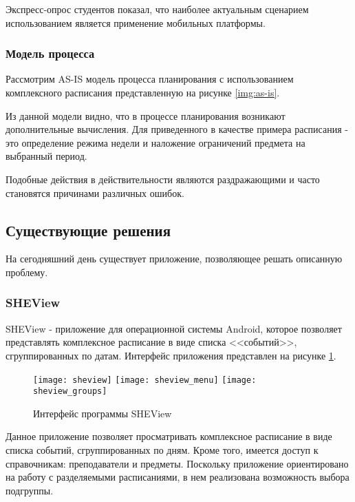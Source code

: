 Экспресс-опрос студентов показал, что наиболее актуальным сценарием использованием является применение мобильных платформы.

\subsubsection{Модель процесса}

Рассмотрим AS-IS модель процесса планирования с использованием комплексного расписания представленную на рисунке \ref{img:as-is}.


Из данной модели видно, что в процессе планирования возникают дополнительные вычисления.
Для приведенного в качестве примера расписания - это определение режима недели и наложение ограничений предмета на выбранный период.

Подобные действия в действительности являются раздражающими и часто становятся причинами различных ошибок.

\subsection{Существующие решения}

На сегодняшний день существует приложение, позволяющее решать описанную проблему.

\subsubsection{SHEView}

SHEView - приложение для операционной системы Android, которое позволяет представлять комплексное расписание в виде списка <<событий>>, сгруппированных по датам.
Интерфейс приложения представлен на рисунке \ref{img:sheview}.

\begin{figure}[!htb]
      \texttt{[image: sheview]}
  \endminipage\hfill
      \texttt{[image: sheview\_menu]}
  \endminipage\hfill
      \texttt{[image: sheview\_groups]}
  \endminipage
  \caption{Интерфейс программы SHEView} \label{img:sheview}
\end{figure}

Данное приложение позволяет просматривать комплексное расписание в виде списка событий, сгруппированных по дням.
Кроме того, имеется доступ к справочникам: преподаватели и предметы.
Поскольку приложение ориентировано на работу с разделяемыми расписаниями, в нем реализована возможность выбора подгруппы.

